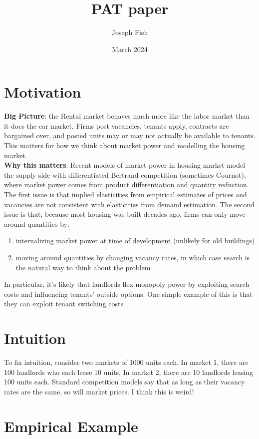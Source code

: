\documentclass{article}
\title{PAT paper}
\author{Joseph Fish}
\date{March 2024}
\begin{document}
\section{Motivation}

\textbf{Big Picture}: the Rental market behaves much more like the labor market than it does the car market. Firms post vacancies, tenants apply, contracts are bargained over, and posted units may or may not actually be available to tenants. This matters for how we think about market power and modelling the housing market. \\

\textbf{Why this matters}: Recent models of market power in housing market model the supply side with differentiated Bertrand competition (sometimes Cournot), where market power comes from product differentiation and quantity reduction. The first issue is that implied elasticities from empirical estimates of prices and vacancies are not consistent with elasticities from demand estimation. The second issue is that, because most housing was built decades ago, firms can only move around quantities by:\\
\begin{enumerate}
    \item internalizing market power at time of development (unlikely for old buildings)
    \item moving around quantities by changing vacancy rates, in which case search is the natural way to think about the problem
\end{enumerate}


In particular, it's  likely that landlords flex monopoly power by exploiting search costs and influencing tenants' outside options. One simple example of this is that they can exploit tenant switching costs

\section{Intuition}
To fix intuition, consider two markets of 1000 units each. In market 1, there are 100 landlords who each lease 10 units. In market 2, there are 10 landlords leasing 100 units each. Standard competition models say that as long as their vacancy rates are the same, so will market prices. I think this is weird!

\section{Empirical Example}
\end{document}
